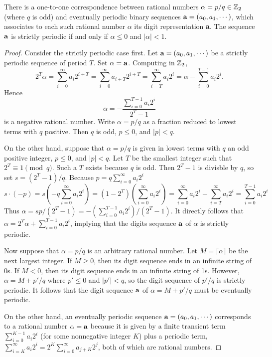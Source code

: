 \begin{proposition}{\rm \cite{art:kg97}}\label{prop:rational-periodic}
	There is a one-to-one correspondence between rational numbers
	$\alpha=p/q\in\mathbb{Z}_2$ (where $q$ is odd) and eventually periodic binary
	sequences ${\bf a}=(a_0,a_1,\cdots)$, which associates to each such rational
	number $\alpha$ its digit representation {\bf a}. The sequence ${\bf a}$ is
	strictly periodic if and only if $\alpha\leq 0$ and $|\alpha|<1$.
\end{proposition}
\begin{proof}
	\par Consider the strictly periodic case first. Let ${\bf a}=(a_0,a_1,\cdots)$
	be a strictly periodic sequence of period $T$. Set $\alpha={\bf a}$. Computing
	in $\mathbb{Z}_2$,
	\[
		2^T\alpha=\sum_{i=0}^\infty a_i2^{i+T}
		         =\sum_{i=0}^\infty a_{i+T}2^{i+T}
						 =\sum_{i=T}^\infty a_i2^i
						 =\alpha-\sum_{i=0}^{T-1}a_i2^i.
	\]
	Hence
	\begin{equation}\label{eqn:3}
		\alpha=-\frac{\sum_{i=0}^{T-1}a_i2^i}{2^T-1}
	\end{equation}
	is a negative rational number. Write $\alpha=p/q$ as a fraction reduced to
	lowest terms with $q$ positive. Then $q$ is odd, $p\leq0$, and $|p|<q$.
	\par On the other hand, suppose that $\alpha=p/q$ is given in lowest terms
	with $q$ an odd positive integer, $p\leq0$, and $|p|<q$. Let $T$ be the
	smallest integer such that $2^T\equiv 1 \pmod q$. Such a $T$ exists because
	$q$ is odd. Then $2^T-1$ is divisble by $q$, so set $s=(2^T-1)/q$. Because
	$p=q\sum_{i=0}^\infty a_i2^i$
	\[
		s\cdot(-p)=s(-q\sum_{i=0}^\infty a_i2^i)
		          =(1-2^T)(\sum_{i=0}^\infty a_i2^i)
		          =\sum_{i=0}^\infty a_i2^i - \sum_{i=T}^\infty a_i2^i
							=\sum_{i=0}^{T-1}a_i2^i
	\]
	Thus $\alpha=sp/(2^T-1)=-(\sum_{i=0}^{T-1}a_i2^i)/(2^T-1)$. It directly
	follows that $\alpha=2^T\alpha+\sum_{i=0}^{T-1}a_i2^i$, implying that the
	digits sequence ${\bf a}$ of $\alpha$ is strictly periodic.
	\par Now suppose that $\alpha=p/q$ is an arbitrary rational number. Let
	$M=\lceil\alpha\rceil$ be the next largest integer. If $M\geq0$, then its digit
	sequence ends in an infinite string of 0s. If $M<0$, then its digit sequence
	ends in an infinite string of 1s. However, $\alpha=M+p'/q$ where $p'\leq0$ and
	$|p'|<q$, so the digit sequence of $p'/q$ is strictly periodic. It follows
	that the digit sequence ${\bf a}$ of $\alpha=M+p'/q$ must be eventually
	periodic.
	\par On the other hand, an eventually periodic sequence ${\bf
	a}=(a_0,a_1,\cdots)$ corresponds to a rational number $\alpha={\bf a}$ because
	it is given by a finite transient term $\sum_{i=0}^{K-1}a_i2^i$ (for some
	nonnegative integer $K$) plus a periodic term, $\sum_{i=K}^\infty
	a_i2^i=2^K\sum_{i=0}^\infty a_{j+K}2^j$, both of which are rational numbers.
\end{proof}



